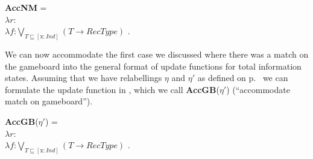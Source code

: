 \begin{ex}
\textbf{AccNM} =\\ 
$\lambda r$:\\
\hspace*{1em}$\lambda
f$:$\displaystyle{\bigvee_{T\sqsubseteq [\mathrm{x}:\mathit{Ind}]}}(T\rightarrow \mathit{RecType})$ . \\
\hspace*{2em} 
\end{ex}

We can now accommodate the first case we discussed where there was a
match on the gameboard into the general format of update functions for
total information states.  Assuming that we have relabellings $\eta$ and $\eta'$
as defined on p.~\pageref{pg:etaprime} we can formulate the update
function in \nexteg{}, which we call \textbf{AccGB}($\eta'$)
(``accommodate match on gameboard'').

\scalebox{.9}
{\begin{ex}
\textbf{AccGB}($\eta'$) =\\ 
\hspace*{-1em}$\lambda r$:\\
\hspace*{-.7em}$\lambda
f$:$\displaystyle{\bigvee_{T\sqsubseteq [\mathrm{x}:\mathit{Ind}]}}(T\rightarrow \mathit{RecType})$ . \\
\hspace*{-.6em} 

\end{ex}}

